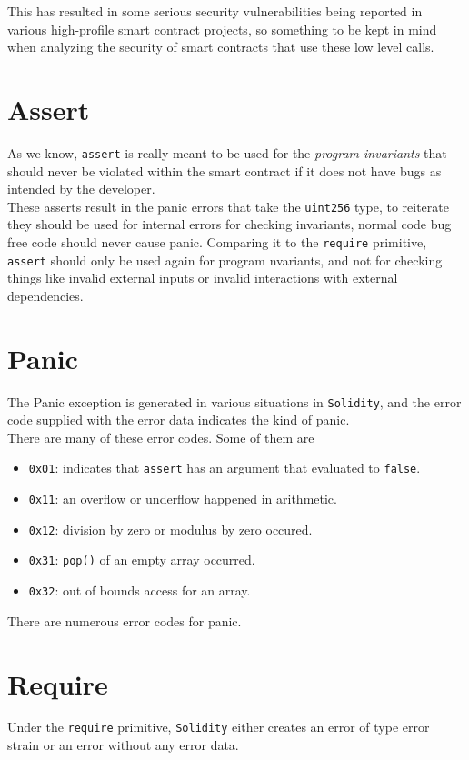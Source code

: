 This has resulted in some serious security vulnerabilities being reported in various high-profile smart contract projects, so something to be kept in mind when analyzing the security of smart contracts that use these low level calls.

\section{Assert}
As we know, \texttt{assert} is really meant to be used for the \textit{program invariants} that should never be violated within the smart contract if it does not have bugs as intended by the developer.\\

These asserts result in the panic errors that take the \texttt{uint256} type, to reiterate they should be used for internal errors for checking invariants, normal code bug free code should never cause panic. Comparing it to the \texttt{require} primitive, \texttt{assert} should only be used again for program  nvariants, and not for checking things like invalid external inputs or invalid interactions with external dependencies.

\section{Panic}

The Panic exception is generated in various situations in \texttt{Solidity}, and the error code supplied with the error data indicates the kind of panic.\\

There are many of these error codes. Some of them are
\begin{itemize}
\item\texttt{0x01}: indicates that \texttt{assert} has an argument that evaluated to \texttt{false}.
\item\texttt{0x11}: an overflow or underflow happened in arithmetic.
\item\texttt{0x12}: division by zero or modulus by zero occured.
\item\texttt{0x31}: \texttt{pop()} of an empty array occurred. 
\item\texttt{0x32}: out of bounds access for an array.
\end{itemize}

There are numerous error codes for panic.

\section{Require}
Under the \texttt{require} primitive, \texttt{Solidity} either creates an error of type error strain or an error without any error data.\\

